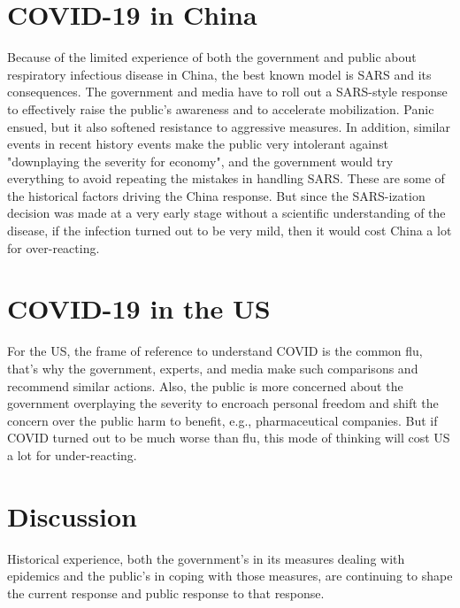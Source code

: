 \documentclass[onecolumn,journal]{IEEEtran}
\begin{document}
\begin{multicols}{2}
\section*{COVID-19 in China}
Because of the limited experience of both the government and public about respiratory infectious disease in China, the best known model is SARS and its consequences. The government and media have to roll out a SARS-style response to effectively raise the public's awareness and to accelerate mobilization. Panic ensued, but it also softened resistance to aggressive measures. In addition, similar events in recent history events make the public very intolerant against "downplaying the severity for economy", and the government would try everything to avoid repeating the mistakes in handling SARS. These are some of the historical factors driving the China response. But since the SARS-ization decision was made at a very early stage without a scientific understanding of the disease, if the infection turned out to be very mild, then it would cost China a lot for over-reacting.

\section*{COVID-19 in the US}
For the US, the frame of reference to understand COVID is the common flu, that's why the government, experts, and media make such comparisons and recommend similar actions. Also, the public is more concerned about the government overplaying the severity to encroach personal freedom and shift the concern over the public harm to benefit, e.g., pharmaceutical companies. But if COVID turned out to be much worse than flu, this mode of thinking will cost US a lot for under-reacting.

\section*{Discussion}
Historical experience, both the government's in its measures dealing with epidemics and the public's in coping with those measures, are continuing to shape the current response and public response to that response. 





\end{multicols}
\end{document}
